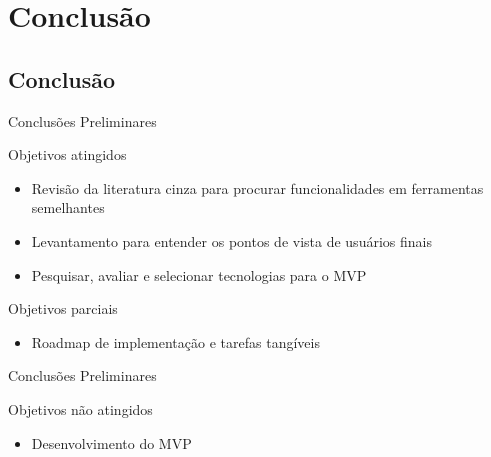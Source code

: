 \section{Conclusão}
\subsection*{Conclusão}

\begin{frame}{{\sffamily Conclusões Preliminares}}
  \begin{block}{Objetivos atingidos}
    \begin{itemize}
      \item Revisão da literatura cinza para procurar funcionalidades em ferramentas semelhantes
      \item Levantamento para entender os pontos de vista de usuários finais
      \item Pesquisar, avaliar e selecionar tecnologias para o MVP
    \end{itemize}
  \end{block}
  \begin{block}{Objetivos parciais}
    \begin{itemize}
      \item Roadmap de implementação e tarefas tangíveis
    \end{itemize}
  \end{block}
\end{frame}
\begin{frame}{{\sffamily Conclusões Preliminares}}
  \begin{block}{Objetivos não atingidos}
    \begin{itemize}
      \item Desenvolvimento do MVP
    \end{itemize}
  \end{block}
\end{frame}